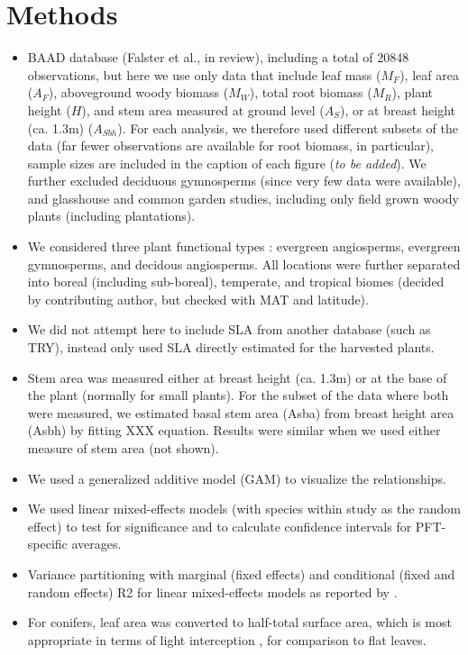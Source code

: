 \documentclass[a4paper]{article}\usepackage[]{graphicx}\usepackage[]{color}
\begin{document}
\begin{enumerate}
\end{enumerate}


\section{Methods}

\begin{itemize}
\item BAAD database (Falster et al., in review), including a total of 20848 observations, but here we use only data that include leaf mass ($M_F$), leaf area ($A_F$), aboveground woody biomass ($M_W$), total root biomass ($M_R$), plant height ($H$), and stem area measured at ground level ($A_S$), or at breast height (ca. 1.3m) ($A_{Sbh}$).  For each analysis, we therefore used different subsets of the data (far fewer observations are available for root biomass, in particular), sample sizes are included in the caption of each figure (\emph{to be added}). We further excluded deciduous gymnosperms (since very few data were available), and glasshouse and common garden studies, including only field grown woody plants (including plantations).

\item We considered three plant functional types : evergreen angiosperms, evergreen gymnosperms, and decidous angiosperms. All locations were further separated into boreal (including sub-boreal), temperate, and tropical biomes (decided by contributing author, but checked with MAT and latitude).

\item We did not attempt here to include SLA from another database (such as TRY), instead only used SLA directly estimated for the harvested plants.

\item Stem area was measured either at breast height (ca. 1.3m) or at the base of the plant (normally for small plants). For the subset of the data where both were measured, we estimated basal stem area (Asba) from breast height area (Asbh) by fitting XXX equation. Results were similar when we used either measure of stem area (not shown).

\item We used a generalized additive model (GAM) to visualize the relationships. 

\item We used linear mixed-effects models (with species within study as the random effect) to test for significance and to calculate confidence intervals for  PFT-specific averages.

\item Variance partitioning with marginal (fixed effects) and conditional (fixed and random effects) R2 for linear mixed-effects models as reported by \cite{nakagawa_general_2013}.

\item For conifers, leaf area was converted to half-total surface area, which is most appropriate in terms of light interception  \cite{lang_application_1991, chen_defining_1992}, for comparison to flat leaves.
\end{itemize}
\end{document}
